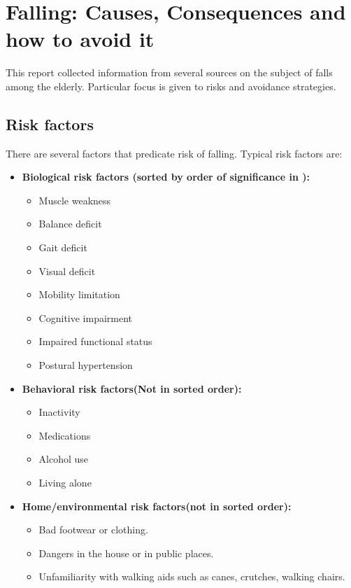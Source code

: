 \section{Falling: Causes, Consequences and how to avoid it}
This report collected information from several sources on the subject of falls among the elderly. Particular focus is given to risks and avoidance strategies.

\subsection{Risk factors}
There are several factors that predicate risk of falling. Typical risk factors are:
\begin{itemize}
\item 
\textbf{Biological risk factors (sorted by order of significance in  \cite{fallsRubenstein}):}
\begin{itemize}
\item Muscle weakness
\item Balance deficit
\item Gait deficit
\item Visual deficit
\item Mobility limitation
\item Cognitive impairment
\item Impaired functional status
\item Postural hypertension
\end{itemize}
\item 
\textbf{Behavioral risk factors(Not in sorted order):}
\begin{itemize}
\item Inactivity \cite{cdcComProg}
\item Medications \cite{cdcComProg}
\item Alcohol use \cite{cdcComProg}
\item Living alone \cite{housing}
\end{itemize}
\item 
\textbf{Home/environmental risk factors(not in sorted order): \cite{WHO}}
\begin{itemize}
\item Bad footwear or clothing.
\item Dangers in the house or in public places.
\item Unfamiliarity with walking aids such as canes, crutches, walking chairs.
\end{itemize}
\end{itemize}

